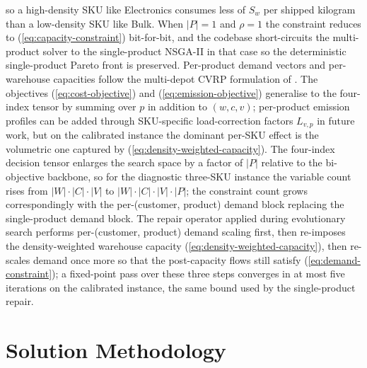 \documentclass[review,preprint,authoryear,12pt]{elsarticle}
\begin{document}
so a high-density SKU like Electronics consumes less of $S_w$ per
shipped kilogram than a low-density SKU like Bulk. When $|P| = 1$
and $\rho = 1$ the constraint reduces to
(\ref{eq:capacity-constraint}) bit-for-bit, and the codebase
short-circuits the multi-product solver to the single-product
NSGA-II in that case so the deterministic single-product Pareto
front is preserved. Per-product demand vectors and per-warehouse
capacities follow the multi-depot CVRP formulation of
\citet{kek2008mcvrp}. The objectives (\ref{eq:cost-objective}) and
(\ref{eq:emission-objective}) generalise to the four-index tensor by
summing over $p$ in addition to $(w, c, v)$; per-product emission
profiles can be added through SKU-specific load-correction factors
$L_{v, p}$ in future work, but on the calibrated instance the
dominant per-SKU effect is the volumetric one captured by
(\ref{eq:density-weighted-capacity}). The four-index decision tensor
enlarges the search space by a factor of $|P|$ relative to the
bi-objective backbone, so for the diagnostic three-SKU instance the
variable count rises from $|W| \cdot |C| \cdot |V|$ to
$|W| \cdot |C| \cdot |V| \cdot |P|$; the constraint count grows
correspondingly with the per-(customer, product) demand block
replacing the single-product demand block. The repair operator
applied during evolutionary search performs per-(customer, product)
demand scaling first, then re-imposes the density-weighted warehouse
capacity (\ref{eq:density-weighted-capacity}), then re-scales demand
once more so that the post-capacity flows still satisfy
(\ref{eq:demand-constraint}); a fixed-point pass over these three
steps converges in at most five iterations on the calibrated
instance, the same bound used by the single-product repair.

\begin{table}[H]
\centering
\caption{Notation, parameters, and operating-point values used
throughout the framework.}
\label{tab:notation}

\end{table}


\section{Solution Methodology}
\label{sec:methodology}
\end{document}
